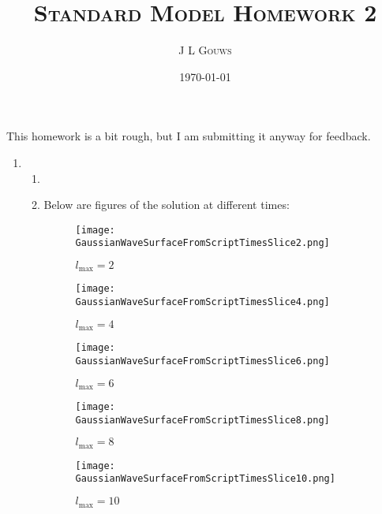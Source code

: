 \documentclass[12pt,a4]{article}
\title{
\textsc{Standard Model Homework 2}
}
\author{\textsc{J L Gouws}
}
\date{\today
\\[1cm]}
\begin{document}
\thispagestyle{empty}

\maketitle

This homework is a bit rough, but I am submitting it anyway for feedback.
\begin{enumerate}
  \item
    \begin{enumerate}
      \item
      \item
        Below are figures of the solution at different times:
        \begin{figure}[!ht]
          \centering
          \texttt{[image: GaussianWaveSurfaceFromScriptTimesSlice2.png]}

          \caption{$l_\text{max} = 2$}
        \end{figure}
        \newpage
        \begin{figure}[!ht]
          \centering
          \texttt{[image: GaussianWaveSurfaceFromScriptTimesSlice4.png]}
          \caption{$l_\text{max} = 4$}
        \end{figure}
        \newpage
        \begin{figure}[!ht]
          \centering
          \texttt{[image: GaussianWaveSurfaceFromScriptTimesSlice6.png]}
          \caption{$l_\text{max} = 6$}
        \end{figure}
        \newpage
        \begin{figure}[!ht]
          \centering
          \texttt{[image: GaussianWaveSurfaceFromScriptTimesSlice8.png]}
          \caption{$l_\text{max} = 8$}
        \end{figure}
        \newpage
        \begin{figure}[!ht]
          \centering
          \texttt{[image: GaussianWaveSurfaceFromScriptTimesSlice10.png]}
          \caption{$l_\text{max} = 10$}
        \end{figure}
        \newpage
    \end{enumerate}
\end{enumerate}
\end{document}
